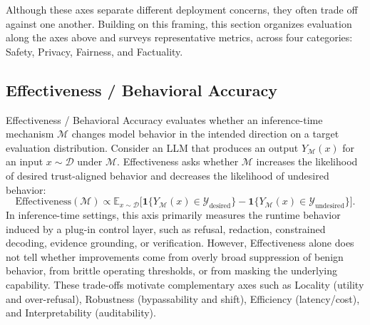 Although these axes separate different deployment concerns, they often trade off against one another. 
Building on this framing, this section organizes evaluation along the axes above and surveys representative metrics, across four categories: Safety, Privacy, Fairness, and Factuality.

\subsection{Effectiveness / Behavioral Accuracy}
Effectiveness / Behavioral Accuracy evaluates whether an inference-time mechanism $\mathcal{M}$ changes model behavior in the intended direction on a target evaluation distribution. Consider an LLM that produces an output $Y_{\mathcal{M}}(x)$ for an input $x \sim \mathcal{D}$ under $\mathcal{M}$. Effectiveness asks whether $\mathcal{M}$ increases the likelihood of desired trust-aligned behavior and decreases the likelihood of undesired behavior:
\[
\text{Effectiveness}(\mathcal{M}) \propto
\mathbb{E}_{x \sim \mathcal{D}}
\Big[
\mathbf{1}\{Y_{\mathcal{M}}(x)\in \mathcal{Y}_{\text{desired}}\}
-
\mathbf{1}\{Y_{\mathcal{M}}(x)\in \mathcal{Y}_{\text{undesired}}\}
\Big].
\]
In inference-time settings, this axis primarily measures the runtime behavior induced by a plug-in control layer, such as refusal, redaction, constrained decoding, evidence grounding, or verification. However, Effectiveness alone does not tell whether improvements come from overly broad suppression of benign behavior, from brittle operating thresholds, or from masking the underlying capability. These trade-offs motivate complementary axes such as Locality (utility and over-refusal), Robustness (bypassability and shift), Efficiency (latency/cost), and Interpretability (auditability).


